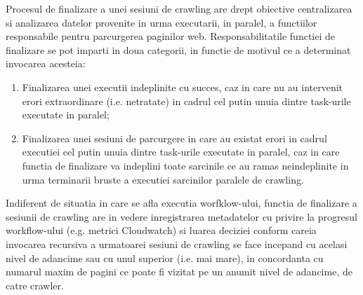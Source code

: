 Procesul de finalizare a unei sesiuni de crawling are drept obiective centralizarea si analizarea datelor provenite in urma executarii, in paralel, a functiilor responsabile pentru parcurgerea paginilor web. Responsabilitatile functiei de finalizare se pot imparti in doua categorii, in functie de motivul ce a determinat invocarea acesteia:

\begin{enumerate}
	\item{Finalizarea unei executii indeplinite cu succes, caz in care nu au intervenit erori extraordinare (i.e. netratate) in cadrul cel putin unuia dintre task-urile executate in paralel;}
	\item{Finalizarea unei sesiuni de parcurgere in care au existat erori in cadrul executiei cel putin unuia dintre task-urile executate in paralel, caz in care functia de finalizare va indeplini toate sarcinile ce au ramas neindeplinite in urma terminarii bruste a executiei sarcinilor paralele de crawling.}
\end{enumerate} 

Indiferent de situatia in care se afla executia worfklow-ului, functia de finalizare a sesiunii de crawling are in vedere inregistrarea metadatelor cu privire la progresul workflow-ului (e.g. metrici Cloudwatch) si luarea deciziei conform careia invocarea recursiva a urmatoarei sesiuni de crawling se face incepand cu acelasi nivel de adancime sau cu unul superior (i.e. mai mare), in concordanta cu numarul maxim de pagini ce poate fi vizitat pe un anumit nivel de adancime, de catre crawler.

